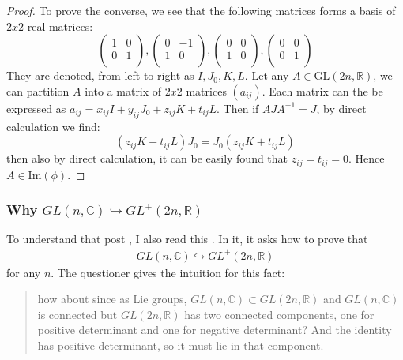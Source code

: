 \documentclass{article}
\numberwithin{equation}{subsection} %
\theoremstyle{definition}
\begin{document}
\begin{proof}
            To prove the converse, we see that the following matrices forms
            a basis of $2x2$ real matrices:
            $$ \left( \begin{array}{cc}
             1 & 0 \\
             0 & 1 \\ \end{array}
            \right),\left( \begin{array}{cc}
             0 & -1 \\
             1 & 0 \\ \end{array}
            \right),\left( \begin{array}{cc}
             0 & 0 \\
             1 & 0 \\ \end{array}
            \right),\left( \begin{array}{cc}
             0 & 0 \\
             0 & 1 \\ \end{array} \right) $$
            They are denoted, from left to right as $I,J_0,K,L$.
            Let any $A\in \mathrm{GL}(2n,\mathbb{R})$, we can partition $A$
            into a matrix of $2x2$ matrices $(a_{ij})$. Each matrix can
            the be expressed as $a_{ij}=x_{ij}I+y_{ij}J_0+z_{ij}K+t_{ij}L$.
            Then if $AJA^{-1}=J$, by direct calculation we find:
            $$ (z_{ij}K+t_{ij}L)J_0=J_0(z_{ij}K+t_{ij}L)$$
            then also by direct calculation, it can be easily found that
            $z_{ij}=t_{ij}=0$. Hence $A\in \mathrm{Im}(\phi)$.
        \end{proof}
        
        \subsubsection{Why \texorpdfstring{
                $GL(n, \mathbb{C}) \hookrightarrow GL^+(2n,\mathbb{R})$
                }{}
            }
        
        To understand that post \cite{math.se_1}, I also read this
        \cite{math.se_2}. In it, it asks how to prove that 
        \begin{align}
            \label{eq:sec.1.1.2_why_glnc_injectInto_positive_comp}
            GL(n, \mathbb{C}) \hookrightarrow GL^+(2n,\mathbb{R})
        \end{align}
        for any $n$. The questioner gives the intuition for this fact:
        \begin{quote}
            how about since as Lie groups, $GL(n,\mathbb{C}) 
            \subset GL(2n, \mathbb{R})$ and $GL(n,\mathbb{C})$ is connected 
            but $GL(2n, \mathbb{R})$ has two connected components, one for 
            positive determinant and one for negative determinant? And the 
            identity has positive determinant, so it must lie in that 
            component.
        \end{quote}
        
\end{document}
